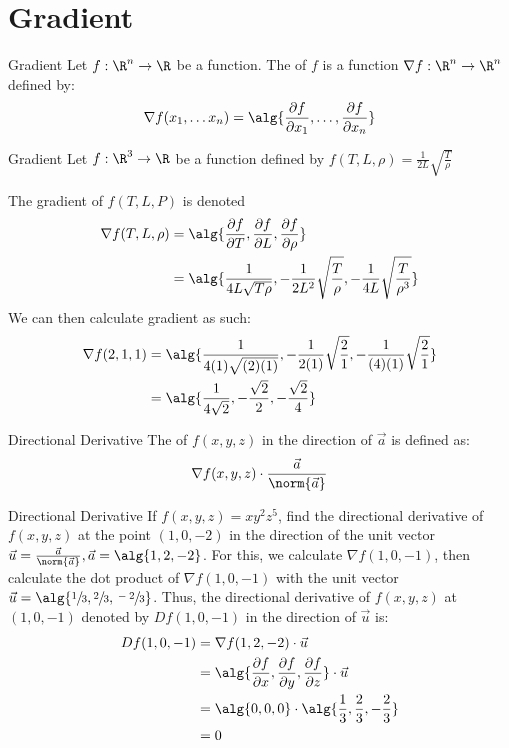 \documentclass[12pt]{report}
\begin{document}
\section{Gradient}

\begin{dfnbox}{Gradient}{}
    Let $f : \R^n \to \R$ be a function. The  of $f$ is a function $\nabla f : \R^n \to \R^n$ defined by:
    \[ \nabla f(x_1, \ldots x_n) = \alg{ \frac{\partial f}{\partial x_1} , \ldots , \frac{\partial f}{\partial x_n} } \]
\end{dfnbox}

\begin{exbox}{Gradient}{}
    Let $f : \R^3 \to \R$ be a function defined by $f(T,L,\rho) = \frac{1}{2L} \sqrt{\frac{T}{\rho}}$

    The gradient of $f(T,L,P)$ is denoted
    \begin{align*}
        \nabla f(T,L,\rho)
        &= \alg{\frac{\partial f}{\partial T}, \frac{\partial f}{\partial L}, \frac{\partial f}{\partial \rho}} \\
        &= \alg{\frac{1}{4L\sqrt{T \rho}}, -\frac{1}{2L^2} \sqrt{\frac{T}{\rho}}, -\frac{1}{4L} \sqrt{\frac{T}{\rho^3}}}
    \end{align*}
    We can then calculate gradient as such:
    \begin{align*}
        \nabla f(2,1,1)
        &= \alg{ \frac{1}{4(1)\sqrt{(2)(1)}} , -\frac{1}{2(1)}\sqrt{\frac{2}{1}} , -\frac{1}{(4)(1)} \sqrt{\frac{2}{1}} } \\
        &= \alg{ \frac{1}{4\sqrt{2}} , -\frac{\sqrt{2}}{2} , - \frac{\sqrt{2}}{4} }
    \end{align*}
\end{exbox}

\begin{dfnbox}{Directional Derivative}{}
    The  of $f(x,y,z)$ in the direction of $\vec{a}$ is defined as:
    \[ \nabla f(x,y,z) \cdot \frac{\vec{a}}{\norm{\vec{a}}} \]
\end{dfnbox}

\begin{exbox}{Directional Derivative}{}
    If $f(x,y,z) = xy^2z^5$, find the directional derivative of $f(x,y,z)$ at the point $(1,0,-2)$ in the direction of the unit vector $\vec{u} = \frac{\vec{a}}{\norm{\vec{a}}}, \vec{a} = \alg{1,2,-2}$.
    \tcblower
    For this, we calculate $\nabla f(1,0,-1)$, then calculate the dot product of $\nabla f(1,0,-1)$ with the unit vector $\vec{u} = \alg{\sfrac{1}{3}, \sfrac{2}{3}, \sfrac{-2}{3}}$. Thus, the directional derivative of $f(x,y,z)$ at $(1,0,-1)$ denoted by $Df(1,0,-1)$ in the direction of $\vec{u}$ is:
    \begin{align*}
        Df(1,0,-1)
        &= \nabla f(1,2,-2) \cdot \vec{u} \\
        &= \alg{\frac{\partial f}{\partial x}, \frac{\partial f}{\partial y}, \frac{\partial f}{\partial z}} \cdot \vec{u} \\
        &= \alg{0,0,0} \cdot \alg{\frac13, \frac23, -\frac23} \\
        &= 0
    \end{align*}
\end{exbox}
\end{document}
